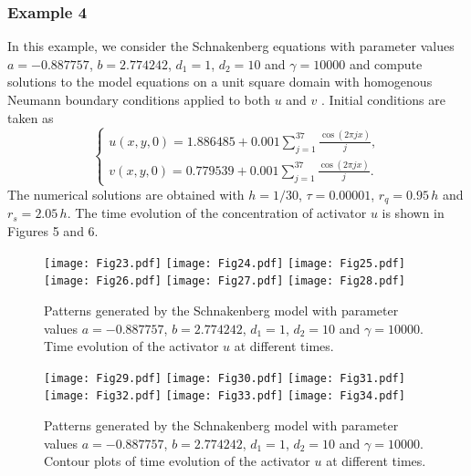 \documentclass[12pt]{article}
\numberwithin{equation}{section}
\begin{document}
\subsubsection{Example 4}
In this example, we consider the Schnakenberg equations with parameter values
$a =-0.887757$, $b = 2.774242$, $d_1=1$,
$d_2=10$ and $\gamma =10000$ and compute solutions to the model equations on a unit square domain with homogenous Neumann boundary conditions applied to both $u$ and $v$ \cite{Fernandes}. Initial conditions are
taken as
\[\left\{ \begin{array}{l}
u(x,y,0) = 1.886485 + 0.001\sum\limits_{j = 1}^{37} {\frac{{\cos (2\pi jx)}}{j}} ,\\
v(x,y,0) = 0.779539 + 0.001\sum\limits_{j = 1}^{37} {\frac{{\cos (2\pi jx)}}{j}} .
\end{array} \right.\]
The numerical solutions are obtained with $h=1/30$, $\tau=0.00001$, $r_q=0.95\,h$ and $r_s=2.05\,h$.
The time evolution of the concentration of activator $u$ is shown in Figures 5 and 6.
\begin{figure}
\begin{center}
\texttt{[image: Fig23.pdf]}
\texttt{[image: Fig24.pdf]}
\texttt{[image: Fig25.pdf]}
\texttt{[image: Fig26.pdf]}
\texttt{[image: Fig27.pdf]}
\texttt{[image: Fig28.pdf]}
\caption{Patterns generated by the Schnakenberg model with parameter values $a = -0.887757$, $b = 2.774242$, $d_1=1$,
$d_2=10$ and $\gamma = 10000$. Time
evolution of the activator $u$ at different times. }
\end{center}
\end{figure}

\begin{figure}
\begin{center}
\texttt{[image: Fig29.pdf]}
\texttt{[image: Fig30.pdf]}
\texttt{[image: Fig31.pdf]}
\texttt{[image: Fig32.pdf]}
\texttt{[image: Fig33.pdf]}
\texttt{[image: Fig34.pdf]}
\caption{Patterns generated by the Schnakenberg model with parameter values $a = -0.887757$, $b = 2.774242$, $d_1=1$,
$d_2=10$ and $\gamma = 10000$. Contour plots of time
evolution of the activator $u$ at different times. }
\end{center}
\end{figure}
\end{document}
